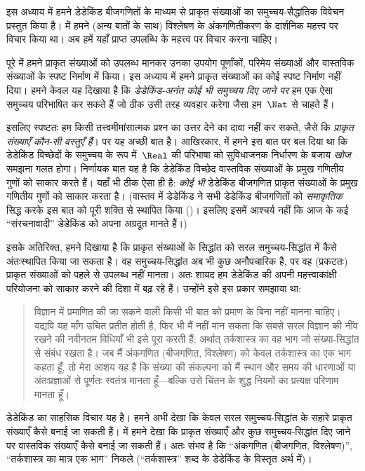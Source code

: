 \documentclass[../../../include/open-logic-section]{subfiles}
\begin{document}


इस अध्याय में हमने डेडेकिंड बीजगणितों के माध्यम से प्राकृत संख्याओं का
समुच्चय-सैद्धांतिक विवेचन प्रस्तुत किया है।  में हमने
(अन्य बातों के साथ) विश्लेषण के अंकगणितीकरण के दार्शनिक महत्त्व पर विचार किया
था। अब हमें यहाँ प्राप्त उपलब्धि के महत्त्व पर विचार करना चाहिए।

पूरे  में हमने प्राकृत संख्याओं को उपलब्ध मानकर उनका
उपयोग पूर्णांकों, परिमेय संख्याओं और वास्तविक संख्याओं के स्पष्ट निर्माण में
किया। इस अध्याय में हमने प्राकृत संख्याओं का कोई स्पष्ट निर्माण नहीं दिया। हमने
केवल यह दिखाया है कि \emph{डेडेकिंड-अनंत कोई भी समुच्चय दिए जाने पर} हम एक ऐसा
समुच्चय परिभाषित कर सकते हैं जो ठीक उसी तरह व्यवहार करेगा जैसा हम~$\Nat$ से
चाहते हैं।

इसलिए स्पष्टतः हम किसी तत्त्वमीमांसात्मक प्रश्न का उत्तर देने का दावा नहीं कर
सकते, जैसे कि \emph{प्राकृत संख्याएँ कौन-सी वस्तुएँ हैं}। पर यह अच्छी बात है।
आखिरकार,  में हमने इस बात पर बल दिया था कि
डेडेकिंड विच्छेदों के समुच्चय के रूप में~$\Real$ की परिभाषा को सुविधाजनक
निर्धारण के बजाय \emph{खोज} समझना गलत होगा। निर्णायक बात यह है कि डेडेकिंड
विच्छेद वास्तविक संख्याओं के प्रमुख गणितीय गुणों को साकार करते हैं। यहाँ भी
ठीक ऐसा ही है: \emph{कोई भी} डेडेकिंड बीजगणित प्राकृत संख्याओं के प्रमुख
गणितीय गुणों को साकार करता है। (वास्तव में डेडेकिंड ने सभी डेडेकिंड बीजगणितों
को \emph{समाकृतिक} सिद्ध करके इस बात को पूरी शक्ति से स्थापित किया
(\citeyear[प्रमेय 132--3]{Dedekind1888})। इसलिए इसमें आश्चर्य नहीं कि आज के कई
``संरचनावादी'' डेडेकिंड को अपना अग्रदूत मानते हैं।)

इसके अतिरिक्त, हमने दिखाया है कि प्राकृत संख्याओं के सिद्धांत को सरल
समुच्चय-सिद्धांत में कैसे अंतःस्थापित किया जा सकता है। वह समुच्चय-सिद्धांत अब
भी कुछ अनौपचारिक है, पर वह (प्रकटतः) प्राकृत संख्याओं को पहले से उपलब्ध नहीं
मानता। अतः शायद हम डेडेकिंड की अपनी महत्त्वाकांक्षी परियोजना को साकार करने की
दिशा में बढ़ रहे हैं। उन्होंने इसे इस प्रकार समझाया था:
\begin{quote}
	विज्ञान में प्रमाणित की जा सकने वाली किसी भी बात को प्रमाण के बिना नहीं
	मानना चाहिए। यद्यपि यह माँग उचित प्रतीत होती है, फिर भी मैं नहीं मान सकता
	कि सबसे सरल विज्ञान की नींव रखने की नवीनतम विधियाँ भी इसे पूरा करती हैं;
	अर्थात् तर्कशास्त्र का वह भाग जो संख्या-सिद्धांत से संबंध रखता है। जब मैं
	अंकगणित (बीजगणित, विश्लेषण) को केवल तर्कशास्त्र का एक भाग कहता हूँ, तो मेरा
	आशय यह है कि संख्या की संकल्पना को मैं स्थान और समय की धारणाओं या
	अंतःप्रज्ञाओं से पूर्णतः स्वतंत्र मानता हूँ---बल्कि उसे चिंतन के शुद्ध
	नियमों का प्रत्यक्ष परिणाम मानता हूँ।
	\citep[प्रस्तावना]{Dedekind1888}
\end{quote}
डेडेकिंड का साहसिक विचार यह है। हमने अभी देखा कि केवल सरल समुच्चय-सिद्धांत के
सहारे प्राकृत संख्याएँ कैसे बनाई जा सकती हैं।  में
हमने देखा कि प्राकृत संख्याएँ और कुछ समुच्चय-सिद्धांत दिए जाने पर वास्तविक
संख्याएँ कैसे बनाई जा सकती हैं। अतः संभव है कि ``अंकगणित (बीजगणित,
विश्लेषण)'', ``तर्कशास्त्र का मात्र एक भाग'' निकले (``तर्कशास्त्र'' शब्द के
डेडेकिंड के विस्तृत अर्थ में)।
\end{document}
